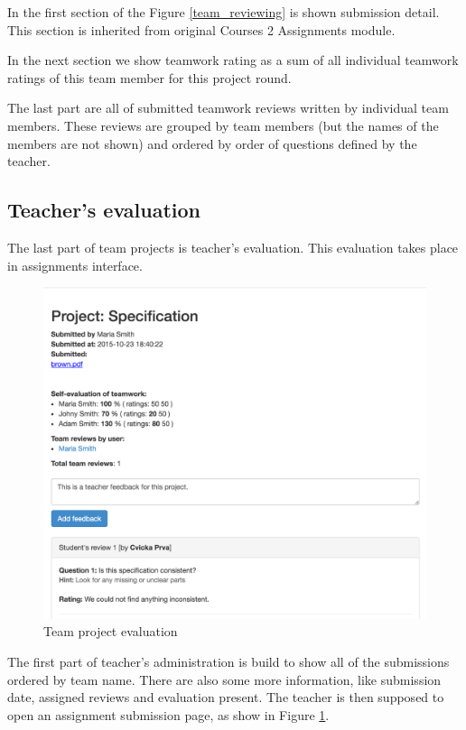 In the first section of the Figure \ref{team_reviewing} is shown submission detail. This section is inherited from original Courses 2 Assignments module.

In the next section we show teamwork rating as a sum of all individual teamwork ratings of this team member for this project round. 

The last part are all of submitted teamwork reviews written by individual team members. These reviews are grouped by team members (but the names of the members are not shown) and ordered by order of questions defined by the teacher. 

\subsection{Teacher's evaluation}
The last part of team projects is teacher's evaluation. This evaluation takes place in assignments interface.

\begin{figure}[h]
    \centering
    \includegraphics[width=\textwidth]{images/teamprojectevaluation.png}
    \caption{Team project evaluation}
    \label{team_submission_admin}
\end{figure}

The first part of teacher's administration is build to show all of the submissions ordered by team name. There are also some more information, like submission date, assigned reviews and evaluation present. The teacher is then supposed to open an assignment submission page, as show in Figure \ref{team_submission_admin}.

